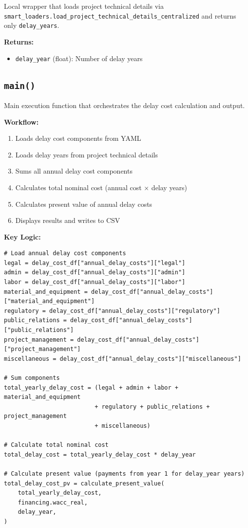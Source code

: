 \documentclass[ctcc_full_documentation.tex]{subfiles}
\begin{document}
Local wrapper that loads project technical details via \texttt{smart\_loaders.load\_project\_technical\_details\_centralized} and returns only \texttt{delay\_years}.

\textbf{Returns:}
\begin{itemize}
    \item \texttt{delay\_year} (float): Number of delay years
\end{itemize}

\subsection{\texttt{main()}}

Main execution function that orchestrates the delay cost calculation and output.

\textbf{Workflow:}
\begin{enumerate}
    \item Loads delay cost components from YAML
    \item Loads delay years from project technical details
    \item Sums all annual delay cost components
    \item Calculates total nominal cost (annual cost × delay years)
    \item Calculates present value of annual delay costs
    \item Displays results and writes to CSV
\end{enumerate}

\textbf{Key Logic:}
\begin{lstlisting}
# Load annual delay cost components
legal = delay_cost_df["annual_delay_costs"]["legal"]
admin = delay_cost_df["annual_delay_costs"]["admin"]
labor = delay_cost_df["annual_delay_costs"]["labor"]
material_and_equipment = delay_cost_df["annual_delay_costs"]["material_and_equipment"]
regulatory = delay_cost_df["annual_delay_costs"]["regulatory"]
public_relations = delay_cost_df["annual_delay_costs"]["public_relations"]
project_management = delay_cost_df["annual_delay_costs"]["project_management"]
miscellaneous = delay_cost_df["annual_delay_costs"]["miscellaneous"]

# Sum components
total_yearly_delay_cost = (legal + admin + labor + material_and_equipment 
                          + regulatory + public_relations + project_management 
                          + miscellaneous)

# Calculate total nominal cost
total_delay_cost = total_yearly_delay_cost * delay_year

# Calculate present value (payments from year 1 for delay_year years)
total_delay_cost_pv = calculate_present_value(
    total_yearly_delay_cost,
    financing.wacc_real,
    delay_year,
)
\end{lstlisting}
\end{document}
